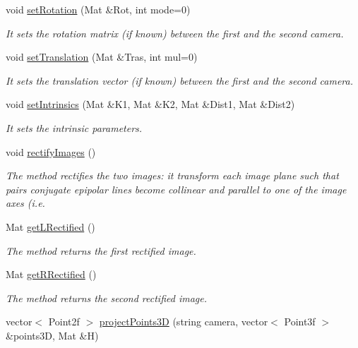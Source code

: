 \begin{DoxyCompactItemize}
void \hyperlink{classStereoCamera_a1329b3894d527e1505618f57a1304624}{set\+Rotation} (Mat \&Rot, int mode=0)
\begin{DoxyCompactList}\small\item\em It sets the rotation matrix (if known) between the first and the second camera. \end{DoxyCompactList}\item 
void \hyperlink{classStereoCamera_a7b10f1218e8e70f47b22080ba1820d39}{set\+Translation} (Mat \&Tras, int mul=0)
\begin{DoxyCompactList}\small\item\em It sets the translation vector (if known) between the first and the second camera. \end{DoxyCompactList}\item 
void \hyperlink{classStereoCamera_a54754623497c8dddb61f520e17f465f8}{set\+Intrinsics} (Mat \&K1, Mat \&K2, Mat \&Dist1, Mat \&Dist2)
\begin{DoxyCompactList}\small\item\em It sets the intrinsic parameters. \end{DoxyCompactList}\item 
void \hyperlink{classStereoCamera_ae5ac866c6d4b6c4819b01a918e7b61e0}{rectify\+Images} ()
\begin{DoxyCompactList}\small\item\em The method rectifies the two images\+: it transform each image plane such that pairs conjugate epipolar lines become collinear and parallel to one of the image axes (i.\+e. \end{DoxyCompactList}\item 
Mat \hyperlink{classStereoCamera_a0bd4492f7f87862955da0bc5d0042cc8}{get\+L\+Rectified} ()
\begin{DoxyCompactList}\small\item\em The method returns the first rectified image. \end{DoxyCompactList}\item 
Mat \hyperlink{classStereoCamera_aaf4ba8eaa338ff24db1196849a96e5e9}{get\+R\+Rectified} ()
\begin{DoxyCompactList}\small\item\em The method returns the second rectified image. \end{DoxyCompactList}\item 
vector$<$ Point2f $>$ \hyperlink{classStereoCamera_a03406c9d31c1b765a8d6ef9641222309}{project\+Points3\+D} (string camera, vector$<$ Point3f $>$ \&points3\+D, Mat \&H)

\end{DoxyCompactItemize}
